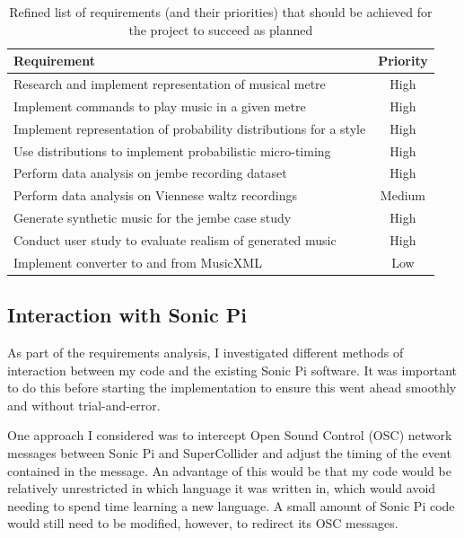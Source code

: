 \documentclass[12pt,twoside,openright]{report}
\begin{document}
\begin{table}[ht]
\centering
\begin{tabularx}{400pt}{Xc}
    \toprule
    \textbf{Requirement}                                      & \textbf{Priority} \\
    \midrule
    Research and implement representation of musical metre              & High \\
    Implement commands to play music in a given metre                   & High \\
    Implement representation of probability distributions for a style   & High \\
    Use distributions to implement probabilistic micro-timing           & High \\
    Perform data analysis on jembe recording dataset                    & High \\
    Perform data analysis on Viennese waltz recordings                  & Medium \\
    Generate synthetic music for the jembe case study                   & High \\
    Conduct user study to evaluate realism of generated music           & High \\
    Implement converter to and from MusicXML                            & Low \\
    \bottomrule
\end{tabularx}
\caption{Refined list of requirements (and their priorities) that should be achieved for the project to succeed as planned}
\label{table:requirements}
\end{table}


\subsection{Interaction with Sonic Pi}

As part of the requirements analysis, I investigated different methods of
interaction between my code and the existing Sonic Pi software. It was important
to do this before starting the implementation to ensure this went ahead smoothly
and without trial-and-error.

One approach I considered was to intercept Open Sound Control (OSC) network
messages between Sonic Pi and SuperCollider and adjust the timing of the event
contained in the message. An advantage of this would be that my code would be relatively
unrestricted in which language it was written in, which would avoid needing to
spend time learning a new language. A small amount of Sonic Pi code would still
need to be modified, however, to redirect its OSC messages.
\end{document}
